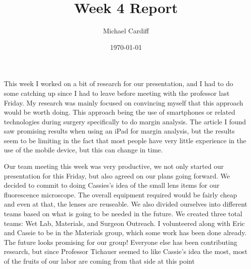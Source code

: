\documentclass[12pt]{article}
\title{Week 4 Report}
\author{Michael Cardiff}
\date{\today}
\begin{document}
\maketitle

This week I worked on a bit of research for our presentation, and I had to do some catching up since I had to leave before meeting with the professor last Friday. My research was mainly focused on convincing myself that this approach would be worth doing. This approach being the use of smartphones or related technologies during surgery specifically to do margin analysis. The article I found saw promising results when using an iPad for margin analysis, but the results seem to be limiting in the fact that most people have very little experience in the use of the mobile device, but this can change in time.

Our team meeting this week was very productive, we not only started our presentation for this Friday, but also agreed on our plans going forward. We decided to commit to doing Cassies's idea of the small lens items for our fluorescence microscope. The overall equipment required would be fairly cheap and even at that, the lenses are reuseable. We also divided ourselves into different teams based on what is going to be needed in the future. We created three total teams: Wet Lab, Materials, and Surgeon Outreach. I volunteered along with Eric and Cassie to be in the Materials group, which some work has been done already. The future looks promising for our group! Everyone else has been contributing research, but since Professor Tichauer seemed to like Cassie's idea the most, most of the fruits of our labor are coming from that side at this point
\end{document}
